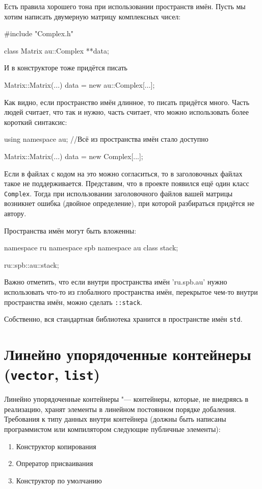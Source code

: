 Есть правила хорошего тона при использовании пространств имён. Пусть мы хотим написать двумерную матрицу комплексных чисел:
\begin{cppcode}
#include "Complex.h"
 
class Matrix
{
        au::Complex **data;
}
\end{cppcode}
И в конструкторе тоже придётся писать
\begin{cppcode}
Matrix::Matrix(...)
{
        data = new au::Complex[...];
}
\end{cppcode}
 
Как видно, если пространство имён длинное, то писать придётся много.
Часть людей считает, что так и нужно, часть считает, что можно использовать более короткий синтаксис:
\begin{cppcode}
using namespace au; //Всё из пространства имён стало доступно
 
Matrix::Matrix(...)
{
        data = new Complex[...];
}
\end{cppcode}
Если в файлах с кодом на это можно согласиться, то в заголовочных файлах такое не поддерживается.
Представим, что в проекте появился ещё один класс \verb'Complex'.
Тогда при использовании заголовочного файлов вашей матрицы возникнет ошибка (двойное определение), при которой разбираться придётся не автору.
 
Пространства имён могут быть вложенны:
\begin{cppcode}
namespace ru
{
        namespace spb
        {
                namespace au
                {
                        class stack;
                }
        }
}
 
ru::spb::au::stack;
\end{cppcode}
 
Важно отметить, что если внутри пространства имён \cpp'ru.spb.au' нужно использовать что-то из глобалного пространства имён, перекрытое чем-то внутри пространства имён, можно сделать \verb'::stack'.
 
Собственно, вся стандартная библиотека хранится в пространстве имён \verb'std'.
 
\section{Линейно упорядоченные контейнеры (\texttt{vector}, \texttt{list})}
 
Линейно упорядоченные контейнеры "--- контейнеры, которые, не внедряясь в реализацию, хранят элементы в линейном постоянном порядке добаления. Требования к типу данных внутри контейнера (должны быть написаны программистом или компилятором следующие публичные элементы):
\begin{enumerate}
        \item Конструктор копирования
        \item Опрератор присваивания
        \item Конструктор по умолчанию
\end{enumerate}
 
